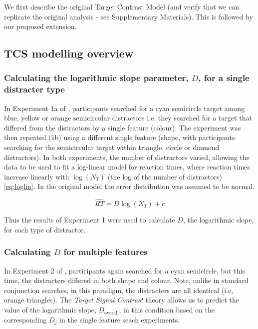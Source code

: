 \documentclass[smallextended]{svjour3}       %
\begin{document}
We first describe the original Target Contrast Model (and verify that we can replicate the original analysis - see Supplementary Materials). This is followed by our proposed extension.

\subsection{TCS modelling overview} 

\subsubsection{Calculating the logarithmic slope parameter, $D$, for a single  distracter type}
\label{sec:fitting_D}

In Experiment 1a of \cite{buetti2019predicting}, participants searched for a cyan semicircle target among blue, yellow or orange semicircular distractors i.e. they searched for a target that differed from the distractors by a single feature (colour). The experiment was then repeated (1b) using a different single feature (shape, with participants searching for the semicircular target within triangle, circle or diamond distractors). In both experiments, the number of distractors varied, allowing the data to be used to fit a log-linear model for reaction times, where reaction times increase linearly with $\log(N_T)$ (the log of the number of distractors) \ref{eq:loglin}. In the original model the error distribution was assumed to be normal. 

\begin{equation}
\hat{RT} = D\log(N_T) + c
\label{eq:loglin}
\end{equation}

Thus the results of Experiment 1 were used to calculate $D$, the logarithmic slope, for each type of distractor.

\subsubsection{Calculating $D$ for multiple features}

In Experiment 2 of \cite{buetti2019predicting}, participants again searched for a cyan semicircle, but this time, the distracters differed in both shape and colour. Note, unlike in standard conjunction searches, in this paradigm, the distracters are all identical (i.e, orange triangles). The \textit{Target Signal Contrast} theory allows us to predict the value of the logarithmic slope, $D_\text{overall}$, in this condition based on the  corresponding $D_j$ in the single feature seach experiments. 
\end{document}
